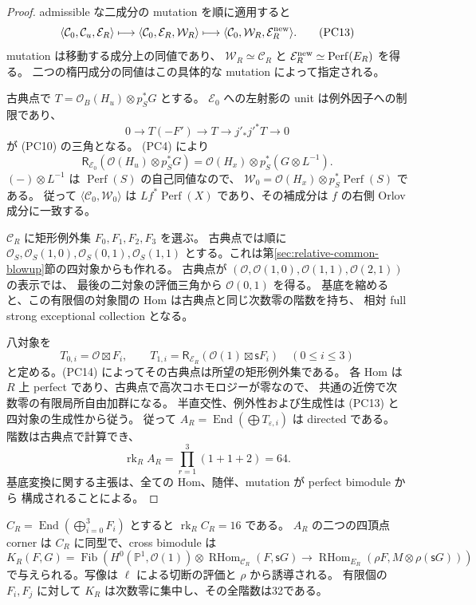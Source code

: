 \begin{proof}
admissible な二成分の mutation を順に適用すると
\[
 \langle\mathcal C_0,\mathcal C_u,\mathcal E_R\rangle
 \longmapsto
 \langle\mathcal C_0,\mathcal E_R,\mathcal W_R\rangle
 \longmapsto
 \langle\mathcal C_0,\mathcal W_R,\mathcal E_R^{\rm new}\rangle.
 \tag{PC13}
\]
mutation は移動する成分上の同値であり、
$\mathcal W_R\simeq\mathcal C_R$ と
$\mathcal E_R^{\rm new}\simeq\operatorname{Perf}(E_R)$ を得る。
二つの楕円成分の同値はこの具体的な mutation によって指定される。

古典点で $T=\mathcal O_B(H_u)\otimes p_S^*G$ とする。
$\mathcal E_0$ への左射影の unit は例外因子への制限であり、
\[
 0\longrightarrow T(-F')\longrightarrow T
 \longrightarrow j'_*j'^*T\longrightarrow0
\]
が (PC10) の三角となる。
(PC4) により
\[
 \mathsf R_{\mathcal E_0}
       (\mathcal O(H_u)\otimes p_S^*G)
 =\mathcal O(H_x)\otimes p_S^*(G\otimes L^{-1}).
 \tag{PC14}
\]
$(-)\otimes L^{-1}$ は $\operatorname{Perf}(S)$ の自己同値なので、
$\mathcal W_0=\mathcal O(H_x)\otimes p_S^*\operatorname{Perf}(S)$ である。
従って $\langle\mathcal C_0,\mathcal W_0\rangle$ は
$Lf^*\operatorname{Perf}(X)$ であり、その補成分は $f$ の右側 Orlov 成分に一致する。

$\mathcal C_R$ に矩形例外集 $F_0,F_1,F_2,F_3$ を選ぶ。
古典点では順に $\mathcal O_S,\mathcal O_S(1,0),\mathcal O_S(0,1),\mathcal O_S(1,1)$
とする。これは第\ref{sec:relative-common-blowup}節の四対象からも作れる。
古典点が $(\mathcal O,\mathcal O(1,0),\mathcal O(1,1),\mathcal O(2,1))$ の表示では、
最後の二対象の評価三角から $\mathcal O(0,1)$ を得る。
基底を縮めると、この有限個の対象間の Hom は古典点と同じ次数零の階数を持ち、
相対 full strong exceptional collection となる。

八対象を
\[
 T_{0,i}=\mathcal O\boxtimes F_i,\qquad
 T_{1,i}=\mathsf R_{\mathcal E_R}
              (\mathcal O(1)\boxtimes\mathsf s F_i)
 \quad(0\le i\le3)
 \tag{PC15}
\]
と定める。(PC14) によってその古典点は所望の矩形例外集である。
各 Hom は $R$ 上 perfect であり、古典点で高次コホモロジーが零なので、
共通の近傍で次数零の有限局所自由加群になる。
半直交性、例外性および生成性は (PC13) と四対象の生成性から従う。
従って $A_R=\operatorname{End}(\bigoplus T_{\varepsilon,i})$ は directed である。
階数は古典点で計算でき、
\[
 \operatorname{rk}_R A_R
 =\prod_{r=1}^3\left(1+1+2\right)=64.
 \tag{PC16}
\]
基底変換に関する主張は、全ての Hom、随伴、mutation が perfect bimodule から
構成されることによる。
\end{proof}

\begin{proposition}\label{pcat:kernel-bimodule}
$C_R=\operatorname{End}(\bigoplus_{i=0}^3F_i)$ とすると $\operatorname{rk}_R C_R=16$ である。
$A_R$ の二つの四頂点 corner は $C_R$ に同型で、cross bimodule は
\[
 K_R(F,G)=\operatorname{Fib}\!\left(
 H^0(\mathbb P^1,\mathcal O(1))\otimes
       \operatorname{RHom}_{\mathcal C_R}(F,\mathsf sG)
 \longrightarrow
 \operatorname{RHom}_{E_R}(\rho F,M\otimes\rho(\mathsf sG))
 \right)
 \tag{PC17}
\]
で与えられる。写像は $\ell$ による切断の評価と $\rho$ から誘導される。
有限個の $F_i,F_j$ に対して $K_R$ は次数零に集中し、その全階数は32である。
\end{proposition}

